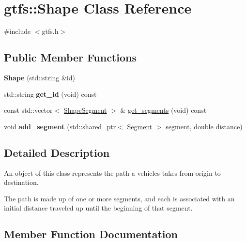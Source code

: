 \hypertarget{classgtfs_1_1Shape}{}\section{gtfs\+:\+:Shape Class Reference}
\label{classgtfs_1_1Shape}


{\ttfamily \#include $<$gtfs.\+h$>$}

\subsection*{Public Member Functions}
\begin{DoxyCompactItemize}
\item 
\mbox{\label{classgtfs_1_1Shape_ace6a58f57452ab0d2830b518a0ed2bde}} 
{\bfseries Shape} (std\+::string \&id)
\item 
\mbox{\label{classgtfs_1_1Shape_ad8f8c0c5c19d4a8e840be1ed9a89de9e}} 
std\+::string {\bfseries get\+\_\+id} (void) const
\item 
const std\+::vector$<$ \hyperlink{structgtfs_1_1ShapeSegment}{Shape\+Segment} $>$ \& \hyperlink{classgtfs_1_1Shape_ab6959c8c957c2548313e4cf76bd2a2dd}{get\+\_\+segments} (void) const
\item 
\mbox{\label{classgtfs_1_1Shape_afb5bfd99bafb82eb085198218fe13342}} 
void {\bfseries add\+\_\+segment} (std\+::shared\+\_\+ptr$<$ \hyperlink{classgtfs_1_1Segment}{Segment} $>$ segment, double distance)
\end{DoxyCompactItemize}


\subsection{Detailed Description}
An object of this class represents the path a vehicles takes from origin to destination.

The path is made up of one or more segments, and each is associated with an initial distance traveled up until the beginning of that segment. 

\subsection{Member Function Documentation}
\mbox{\label{classgtfs_1_1Shape_ab6959c8c957c2548313e4cf76bd2a2dd}} 
